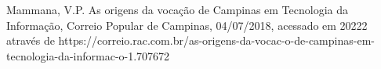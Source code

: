 \documentclass[
12pt,		%
openright,	%
twoside,  %
a4paper,			%
chapter=TITLE,		%
english,			%
french,				%
spanish,			%
brazil				%
]{USPSC-classe/USPSC}
\begin{document}
\begin{flushleft}
\begin{flushleft}
\begin{flushleft}
\begin{flushleft}
\begin{flushleft}
\begin{flushleft}
\begin{flushleft}
\begin{flushleft}
\begin{flushleft}
\begin{flushleft}
\begin{flushleft}
\begin{flushleft}
\begin{flushleft}
\begin{flushleft}
\begin{flushleft}
\begin{flushleft}
\begin{flushleft}
[MAMMANA, 2018] Mammana, V.P. As origens da voca\c{c}\~ao de Campinas em Tecnologia da Informa\c{c}\~ao, Correio Popular de Campinas, 04/07/2018, acessado em 20222 atrav\'es de https://correio.rac.com.br/as-origens-da-vocac-o-de-campinas-em-tecnologia-da-informac-o-1.707672
\end{flushleft}


\end{flushleft}


\end{flushleft}


\end{flushleft}


\end{flushleft}


\end{flushleft}


\end{flushleft}


\end{flushleft}


\end{flushleft}


\end{flushleft}


\end{flushleft}


\end{flushleft}


\end{flushleft}


\end{flushleft}


\end{flushleft}


\end{flushleft}


\end{flushleft}
\end{document}
